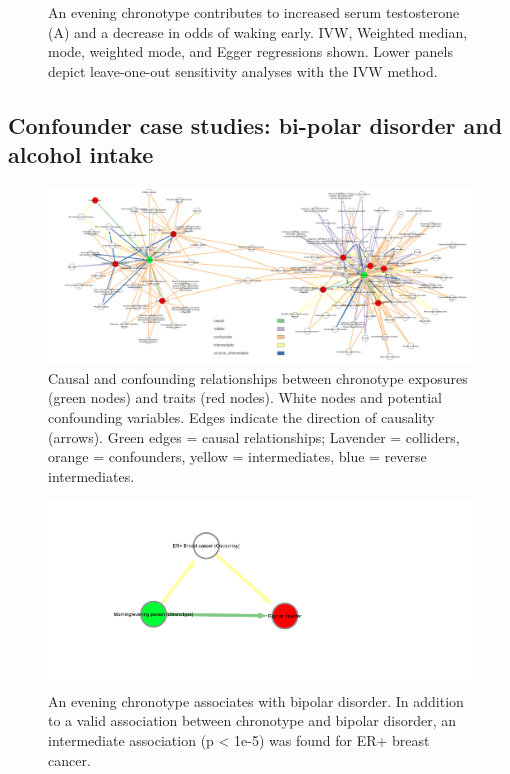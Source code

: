 \documentclass[journal,article,submit,moreauthors,pdftex]{Definitions/mdpi}
\begin{document}
\begin{figure}[htbp]
\begin{subfigure}[b]{0.4\textwidth}
         \caption{}
         \label{waking}
     \end{subfigure}
        \caption{An evening chronotype contributes to increased serum testosterone (A) and a decrease in odds of waking early. IVW, Weighted median, mode, weighted mode, and Egger regressions shown. Lower panels depict leave-one-out sensitivity analyses with the IVW method.}
        \label{t2dmalcohol}
\end{figure}









\subsection{Confounder case studies: bi-polar disorder and alcohol intake}

\begin{figure}[htbp]
	\centering
	\includegraphics[width=0.5\linewidth]{Figs/Analysis3/gBig.png}
	\caption{Causal and confounding relationships between chronotype exposures (green nodes) and traits (red nodes). White nodes and potential confounding variables. Edges indicate the direction of causality (arrows). Green edges = causal relationships; Lavender = colliders, orange = confounders, yellow = intermediates, blue = reverse intermediates.}
	\label{gBig}
\end{figure}

\begin{figure}[htbp]
	\centering
	\includegraphics[width=0.5\linewidth]{Figs/Analysis3/morning_bipolar.png}
	\caption{An evening chronotype associates with bipolar disorder. In addition to a valid association between chronotype and bipolar disorder, an intermediate association (p < 1e-5) was found for ER+ breast cancer.}
	\label{chronoBipolar}
\end{figure}
\end{document}
